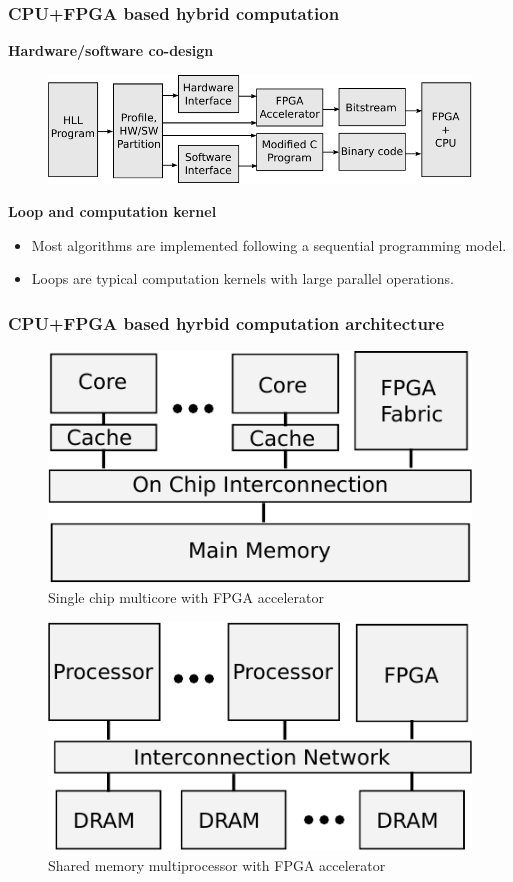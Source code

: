 \documentclass{beamer}
\begin{document}
\begin{frame}[t]
\frametitle{CPU+FPGA based hybrid computation}

\textbf{Hardware/software co-design}
\begin{figure}
\includegraphics[width=0.8\linewidth]{codesign}
\end{figure}

\textbf{Loop and computation kernel}
\begin{itemize}
\item Most algorithms are implemented following a sequential programming model.
\item Loops are typical computation kernels with large parallel operations.
\end{itemize}

\end{frame}

\begin{frame}[t]
\frametitle{CPU+FPGA based hyrbid computation architecture}

\begin{figure}
\includegraphics[width=0.5\linewidth]{system-context}
\vspace{-1em}
\caption{Single chip multicore with FPGA accelerator}
\end{figure}

\begin{figure}
\includegraphics[width=0.5\linewidth]{system-context2}
\vspace{-1em}
\caption{Shared memory multiprocessor with FPGA accelerator}
\end{figure}

\end{frame}
\end{document}
